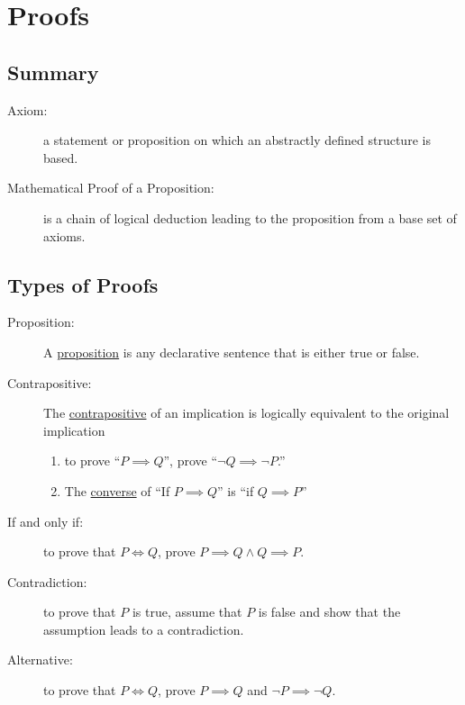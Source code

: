 \documentclass[solution, letterpaper]{cs20}
\begin{document}
    \section{Proofs}
    \subsection{Summary}
    \begin{description}
        \item [Axiom:] a statement or proposition on which an abstractly defined structure is based.
	    \item [Mathematical Proof of a Proposition:] is a chain of logical deduction leading to the proposition from a base set of axioms.
	\end{description}

	\subsection{Types of Proofs}
	    \begin{description}
            \item [Proposition: ] A \underline{proposition} is any declarative sentence that is either true or false.
            \item [Contrapositive: ] The \underline{contrapositive} of an implication is logically equivalent to the original implication
            \begin{enumerate}
            \item to prove “$P \implies Q$”, prove “$\neg Q \implies \neg P$.”
            \item The \underline{converse} of “If $P \implies Q$” is “if $Q \implies P$”
            \end{enumerate}
            \item [If and only if: ] to prove that $P \iff Q$, prove $P \implies Q \land Q \implies P$.
            \item [Contradiction: ] to prove that $P$ is true, assume that $P$ is false and show that the assumption leads to a contradiction.
            \item [Alternative: ] to prove that $P \iff Q$, prove $P \implies Q$ and $\neg P \implies \neg Q$.
        \end{description}
\end{document}
